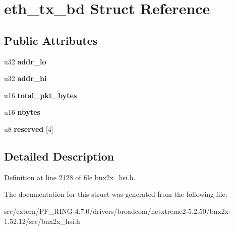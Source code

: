 \hypertarget{structeth__tx__bd}{
\section{eth\_\-tx\_\-bd Struct Reference}
\label{structeth__tx__bd}
}
\subsection*{Public Attributes}
\begin{DoxyCompactItemize}
\item 
\hypertarget{structeth__tx__bd_a2879761d44529b2507c31dfb82414d24}{
u32 {\bfseries addr\_\-lo}}
\label{structeth__tx__bd_a2879761d44529b2507c31dfb82414d24}

\item 
\hypertarget{structeth__tx__bd_ad40db167386fbbe44778417ca6d1ac8a}{
u32 {\bfseries addr\_\-hi}}
\label{structeth__tx__bd_ad40db167386fbbe44778417ca6d1ac8a}

\item 
\hypertarget{structeth__tx__bd_a191ae29fdf8713d974d8d08c94106db0}{
u16 {\bfseries total\_\-pkt\_\-bytes}}
\label{structeth__tx__bd_a191ae29fdf8713d974d8d08c94106db0}

\item 
\hypertarget{structeth__tx__bd_a8910f417d70366b9ba2a46bd2a9b1a1a}{
u16 {\bfseries nbytes}}
\label{structeth__tx__bd_a8910f417d70366b9ba2a46bd2a9b1a1a}

\item 
\hypertarget{structeth__tx__bd_acc8b1f5c7d52d0c86b41f2e20a4cd933}{
u8 {\bfseries reserved} \mbox{[}4\mbox{]}}
\label{structeth__tx__bd_acc8b1f5c7d52d0c86b41f2e20a4cd933}

\end{DoxyCompactItemize}


\subsection{Detailed Description}


Definition at line 2128 of file bnx2x\_\-hsi.h.



The documentation for this struct was generated from the following file:\begin{DoxyCompactItemize}
\item 
src/extern/PF\_\-RING-\/4.7.0/drivers/broadcom/netxtreme2-\/5.2.50/bnx2x-\/1.52.12/src/bnx2x\_\-hsi.h\end{DoxyCompactItemize}
